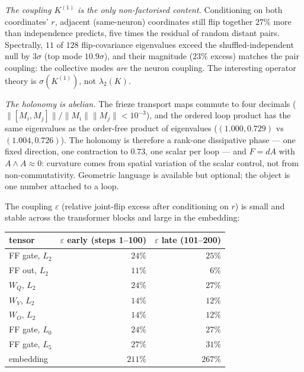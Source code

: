 \emph{The coupling $K^{(1)}$ is the only non-factorised content.} Conditioning on
both coordinates' $r$, adjacent (same-neuron) coordinates still flip together
$27\%$ more than independence predicts, five times the residual of random distant
pairs. Spectrally, $11$ of $128$ flip-covariance eigenvalues exceed the
shuffled-independent null by $3\sigma$ (top mode $10.9\sigma$), and their
magnitude ($23\%$ excess) matches the pair coupling: the collective modes
\emph{are} the neuron coupling. The interesting operator theory is
$\sigma(K^{(1)})$, not $\lambda_2(K)$.

\emph{The holonomy is abelian.} The frieze transport maps commute to four
decimals ($\|[M_i,M_j]\|/\|M_i\|\|M_j\| < 10^{-3}$), and the ordered loop product
has the same eigenvalues as the order-free product of eigenvalues
($(1.000,0.729)$ vs $(1.004,0.726)$). The holonomy is therefore a rank-one
dissipative phase --- one fixed direction, one contraction to $0.73$, one scalar
per loop --- and $F = dA$ with $A\wedge A \approx 0$: curvature comes from
spatial variation of the scalar control, not from non-commutativity. Geometric
language is available but optional; the object is one number attached to a loop.

\begin{proposition}
The coupling $\varepsilon$ (relative joint-flip excess after conditioning on $r$)
is small and stable across the transformer blocks and large in the embedding:
\end{proposition}

\begin{center}
\begin{tabular}{lrr}
\toprule
tensor & $\varepsilon$ early (steps 1--100) & $\varepsilon$ late (101--200) \\
\midrule
FF gate, $L_2$      & $24\%$ & $25\%$ \\
FF out, $L_2$       & $11\%$ & $\phantom{0}6\%$ \\
$W_Q$, $L_2$        & $24\%$ & $27\%$ \\
$W_V$, $L_2$        & $14\%$ & $12\%$ \\
$W_O$, $L_2$        & $14\%$ & $12\%$ \\
FF gate, $L_0$      & $24\%$ & $27\%$ \\
FF gate, $L_5$      & $27\%$ & $31\%$ \\
embedding           & $211\%$ & $267\%$ \\
\bottomrule
\end{tabular}
\end{center}

